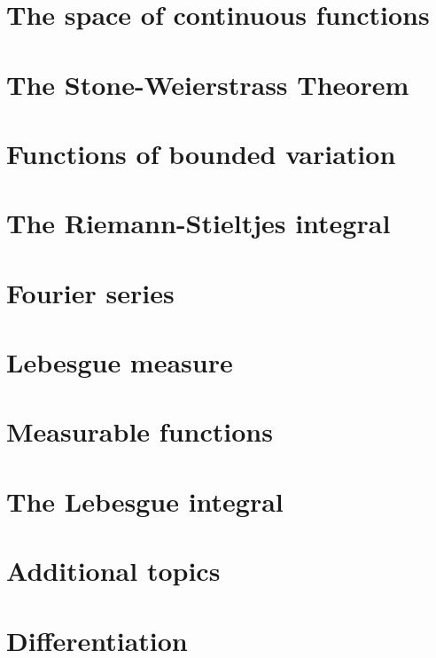 \documentclass{bookSolutions}
\begin{document}
\section{The space of continuous functions}

\section{The Stone-Weierstrass Theorem}

\section{Functions of bounded variation}

\section{The Riemann-Stieltjes integral}

\section{Fourier series}

\section{Lebesgue measure}

\section{Measurable functions}

\section{The Lebesgue integral}

\section{Additional topics}

\section{Differentiation}
\end{document}
